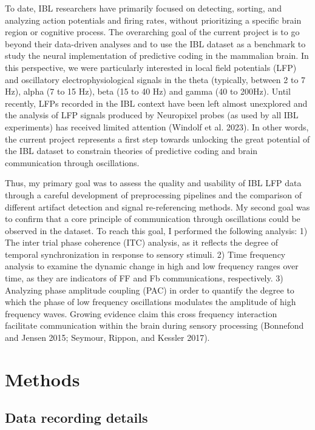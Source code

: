 \documentclass[
  letterpaper,
  DIV=11,
  numbers=noendperiod]{scrartcl}
\begin{document}
To date, IBL researchers have primarily focused on detecting, sorting,
and analyzing action potentials and firing rates, without prioritizing a
specific brain region or cognitive process. The overarching goal of the
current project is to go beyond their data-driven analyses and to use
the IBL dataset as a benchmark to study the neural implementation of
predictive coding in the mammalian brain. In this perspective, we were
particularly interested in local field potentials (LFP) and oscillatory
electrophysiological signals in the theta (typically, between 2 to 7
Hz), alpha (7 to 15 Hz), beta (15 to 40 Hz) and gamma (40 to 200Hz).
Until recently, LFPs recorded in the IBL context have been left almost
unexplored and the analysis of LFP signals produced by Neuropixel probes
(as used by all IBL experiments) has received limited attention (Windolf
et al. 2023). In other words, the current project represents a first
step towards unlocking the great potential of the IBL dataset to
constrain theories of predictive coding and brain communication through
oscillations.

Thus, my primary goal was to assess the quality and usability of IBL LFP
data through a careful development of preprocessing pipelines and the
comparison of different artifact detection and signal re-referencing
methods. My second goal was to confirm that a core principle of
communication through oscillations could be observed in the dataset. To
reach this goal, I performed the following analysis: 1) The inter trial
phase coherence (ITC) analysis, as it reflects the degree of temporal
synchronization in response to sensory stimuli. 2) Time frequency
analysis to examine the dynamic change in high and low frequency ranges
over time, as they are indicators of FF and Fb communications,
respectively. 3) Analyzing phase amplitude coupling (PAC) in order to
quantify the degree to which the phase of low frequency oscillations
modulates the amplitude of high frequency waves. Growing evidence claim
this cross frequency interaction facilitate communication within the
brain during sensory processing (Bonnefond and Jensen 2015; Seymour,
Rippon, and Kessler 2017).

\section{Methods}\label{methods}

\subsection{Data recording details}\label{data-recording-details}
\end{document}
